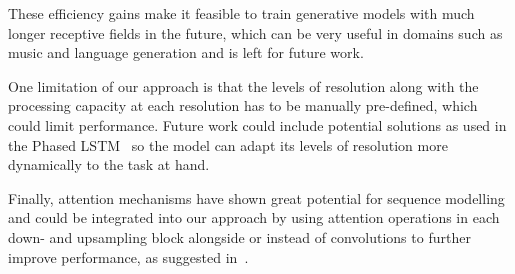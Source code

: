 \documentclass{article}
\begin{document}
These efficiency gains make it feasible to train generative models with much longer receptive fields in the future, which can be very useful in domains such as music and language generation and is left for future work.

One limitation of our approach is that the levels of resolution along with the processing capacity at each resolution has to be manually pre-defined, which could limit performance.
Future work could include potential solutions as used in the Phased LSTM~\cite{neilPhasedLSTM2016} so the model can adapt its levels of resolution more dynamically to the task at hand.

Finally, attention mechanisms have shown great potential for sequence modelling and could be integrated into our approach by using attention operations in each down- and upsampling block alongside or instead of convolutions to further improve performance, as suggested in~\cite{childGeneratingLong2019}.



\end{document}
